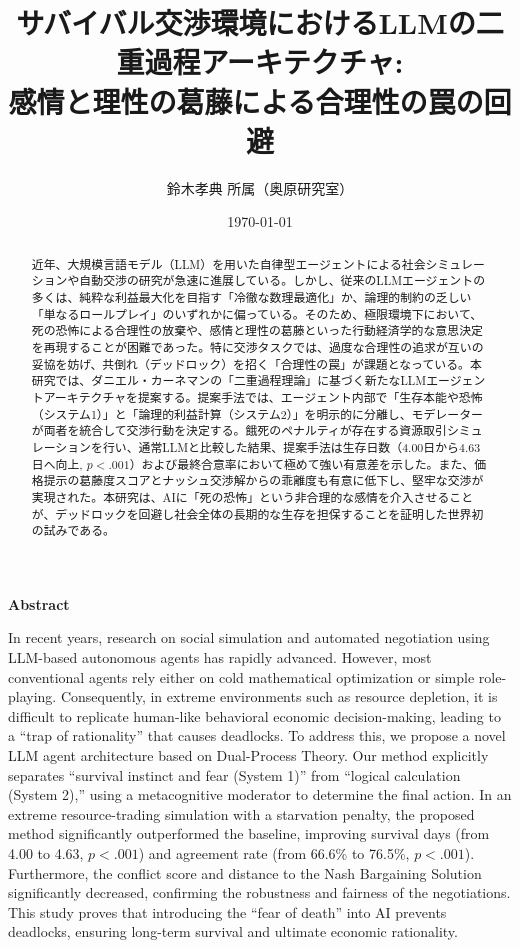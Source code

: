 \documentclass[11pt,a4paper]{ltjsarticle}
\title{サバイバル交渉環境におけるLLMの二重過程アーキテクチャ:\\感情と理性の葛藤による合理性の罠の回避}
\author{鈴木孝典 \quad 所属（奥原研究室）}
\date{\today}
\begin{document}
\maketitle

\begin{center}
\textbf{Abstract}
\end{center}
\vspace{-2mm}
{\small
In recent years, research on social simulation and automated negotiation using LLM-based autonomous agents has rapidly advanced. However, most conventional agents rely either on cold mathematical optimization or simple role-playing. Consequently, in extreme environments such as resource depletion, it is difficult to replicate human-like behavioral economic decision-making, leading to a ``trap of rationality'' that causes deadlocks. To address this, we propose a novel LLM agent architecture based on Dual-Process Theory. Our method explicitly separates ``survival instinct and fear (System 1)'' from ``logical calculation (System 2),'' using a metacognitive moderator to determine the final action. In an extreme resource-trading simulation with a starvation penalty, the proposed method significantly outperformed the baseline, improving survival days (from 4.00 to 4.63, $p < .001$) and agreement rate (from 66.6\% to 76.5\%, $p < .001$). Furthermore, the conflict score and distance to the Nash Bargaining Solution significantly decreased, confirming the robustness and fairness of the negotiations. This study proves that introducing the ``fear of death'' into AI prevents deadlocks, ensuring long-term survival and ultimate economic rationality.
}
\vspace{5mm}

\begin{abstract}
近年、大規模言語モデル（LLM）を用いた自律型エージェントによる社会シミュレーションや自動交渉の研究が急速に進展している。しかし、従来のLLMエージェントの多くは、純粋な利益最大化を目指す「冷徹な数理最適化」か、論理的制約の乏しい「単なるロールプレイ」のいずれかに偏っている。そのため、極限環境下において、死の恐怖による合理性の放棄や、感情と理性の葛藤といった行動経済学的な意思決定を再現することが困難であった。特に交渉タスクでは、過度な合理性の追求が互いの妥協を妨げ、共倒れ（デッドロック）を招く「合理性の罠」が課題となっている。本研究では、ダニエル・カーネマンの「二重過程理論」に基づく新たなLLMエージェントアーキテクチャを提案する。提案手法では、エージェント内部で「生存本能や恐怖（システム1）」と「論理的利益計算（システム2）」を明示的に分離し、モデレーターが両者を統合して交渉行動を決定する。餓死のペナルティが存在する資源取引シミュレーションを行い、通常LLMと比較した結果、提案手法は生存日数（4.00日から4.63日へ向上, $p < .001$）および最終合意率において極めて強い有意差を示した。また、価格提示の葛藤度スコアとナッシュ交渉解からの乖離度も有意に低下し、堅牢な交渉が実現された。本研究は、AIに「死の恐怖」という非合理的な感情を介入させることが、デッドロックを回避し社会全体の長期的な生存を担保することを証明した世界初の試みである。
\end{abstract}
\end{document}
